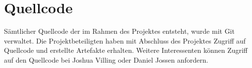 \section{Quellcode}\label{sec:quellcode}

Sämtlicher Quellcode der im Rahmen des Projektes entsteht, wurde mit Git verwaltet.
Die Projektbeteiligten haben mit Abschluss des Projektes Zugriff auf Quellcode und erstellte Artefakte erhalten.
Weitere Interessenten können Zugriff auf den Quellcode bei Joshua Villing oder Daniel Jossen anfordern.

\clearpage
